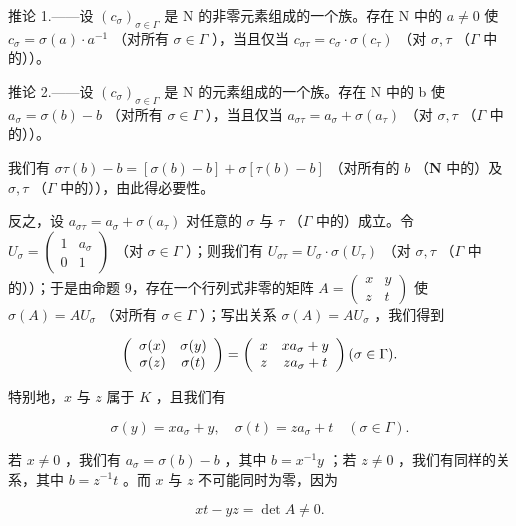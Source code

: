 推论 1.——设 \((c_{\sigma})_{\sigma \in \Gamma}\) 是 N 的非零元素组成的一个族。存在 N 中的 \(a \neq 0\) 使 \(c_{\sigma} = \sigma(a) \cdot a^{-1}\) （对所有 \(\sigma \in \Gamma\) ），当且仅当 \(c_{\sigma\tau} = c_{\sigma} \cdot \sigma(c_{\tau})\) （对 \(\sigma, \tau\) （\(\Gamma\) 中的））。

推论 2.——设 \((c_{\sigma})_{\sigma \in \Gamma}\) 是 N 的元素组成的一个族。存在 N 中的 b 使 \(a_{\sigma} = \sigma(b) - b\) （对所有 \(\sigma \in \Gamma\) ），当且仅当 \(a_{\sigma\tau} = a_{\sigma} + \sigma(a_{\tau})\) （对 \(\sigma, \tau\) （\(\Gamma\) 中的））。

我们有 \(\sigma \tau(b) - b = [\sigma(b) - b] + \sigma[\tau(b) - b]\) （对所有的 \(b\) （\(\mathbf{N}\) 中的）及 \(\sigma, \tau\) （\(\Gamma\) 中的）），由此得必要性。

反之，设 \(a_{\sigma \tau} = a_{\sigma} + \sigma(a_{\tau})\) 对任意的 \(\sigma\) 与 \(\tau\) （\(\Gamma\) 中的）成立。令 \(U_{\sigma} = \begin{pmatrix} 1 & a_{\sigma} \\ 0 & 1 \end{pmatrix}\) （对 \(\sigma \in \Gamma\) ）；则我们有 \(U_{\sigma \tau} = U_{\sigma} \cdot \sigma(U_{\tau})\) （对 \(\sigma, \tau\) （\(\Gamma\) 中的））；于是由命题 9，存在一个行列式非零的矩阵 \(A = \begin{pmatrix} x & y \\ z & t \end{pmatrix}\) 使 \(\sigma(A) = AU_{\sigma}\) （对所有 \(\sigma \in \Gamma\) ）；写出关系 \(\sigma(A) = AU_{\sigma}\) ，我们得到

\[
\left( \begin{array}{c c} \sigma (x) & \sigma (y) \\ \sigma (z) & \sigma (t) \end{array} \right) = \left( \begin{array}{c c} x & x a _ {\sigma} + y \\ z & z a _ {\sigma} + t \end{array} \right) (\sigma \in \Gamma).
\]

特别地，\(x\) 与 \(z\) 属于 \(K\) ，且我们有

\[
\sigma (y) = x a _ {\sigma} + y, \quad \sigma (t) = z a _ {\sigma} + t \quad (\sigma \in \Gamma).
\]

若 \(x \neq 0\) ，我们有 \(a_{\sigma} = \sigma(b) - b\) ，其中 \(b = x^{-1}y\) ；若 \(z \neq 0\) ，我们有同样的关系，其中 \(b = z^{-1}t\) 。而 \(x\) 与 \(z\) 不可能同时为零，因为

\[
x t - y z = \det A \neq 0.
\]

